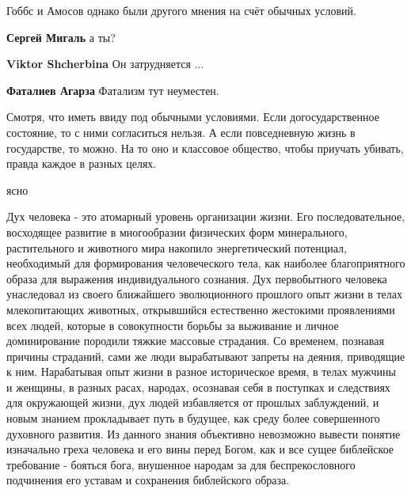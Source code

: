  
 
 
 
 
\zzSecCmt

\begin{itemize} %
Гоббс и Амосов однако были другого мнения на счёт обычных условий.

\begin{itemize} %
\textbf{Сергей Мигаль} а ты?

\textbf{Viktor Shcherbina} Он затрудняется ...

\textbf{Фаталиев Агарза} Фатализм тут неуместен.
\end{itemize} %


Смотря, что иметь ввиду под обычными условиями. Если догосударственное
состояние, то с ними согласиться нельзя. А если повседневную жизнь в
государстве, то можно. На то оно и классовое общество, чтобы приучать убивать,
правда каждое в разных целях.

ясно


Дух человека - это атомарный уровень организации жизни. Его последовательное,
восходящее развитие в многообразии физических форм минерального, растительного
и животного мира накопило энергетический потенциал, необходимый для
формирования человеческого тела, как наиболее благоприятного образа для
выражения индивидуального сознания. Дух первобытного человека унаследовал из
своего ближайшего эволюционного прошлого опыт жизни в телах млекопитающих
животных, открывшийся естественно жестокими проявлениями всех людей, которые в
совокупности борьбы за выживание и личное доминирование породили тяжкие
массовые страдания. Со временем, познавая причины страданий, сами же люди
вырабатывают запреты на деяния, приводящие к ним. Нарабатывая опыт жизни в
разное историческое время, в телах мужчины и женщины, в разных расах, народах,
осознавая себя в поступках и следствиях для окружающей жизни, дух людей
избавляется от прошлых заблуждений, и новым знанием прокладывает путь в
будущее, как среду более совершенного духовного развития. Из данного знания
объективно невозможно вывести понятие изначально греха человека и его вины
перед Богом, как и все сущее библейское требование - бояться бога, внушенное
народам за для беспрекословного подчинения его уставам и сохранения библейского
образа.


\end{itemize}
